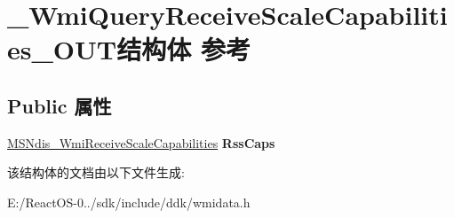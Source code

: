 \hypertarget{struct___wmi_query_receive_scale_capabilities___o_u_t}{}\section{\+\_\+\+Wmi\+Query\+Receive\+Scale\+Capabilities\+\_\+\+O\+U\+T结构体 参考}
\label{struct___wmi_query_receive_scale_capabilities___o_u_t}
\subsection*{Public 属性}
\begin{DoxyCompactItemize}
\item 
\mbox{\label{struct___wmi_query_receive_scale_capabilities___o_u_t_a91fcbb22ef9b75dda9dd16a591bf4712}} 
\hyperlink{struct___m_s_ndis___wmi_receive_scale_capabilities}{M\+S\+Ndis\+\_\+\+Wmi\+Receive\+Scale\+Capabilities} {\bfseries Rss\+Caps}
\end{DoxyCompactItemize}


该结构体的文档由以下文件生成\+:\begin{DoxyCompactItemize}
\item 
E\+:/\+React\+O\+S-\/0../sdk/include/ddk/wmidata.\+h\end{DoxyCompactItemize}
